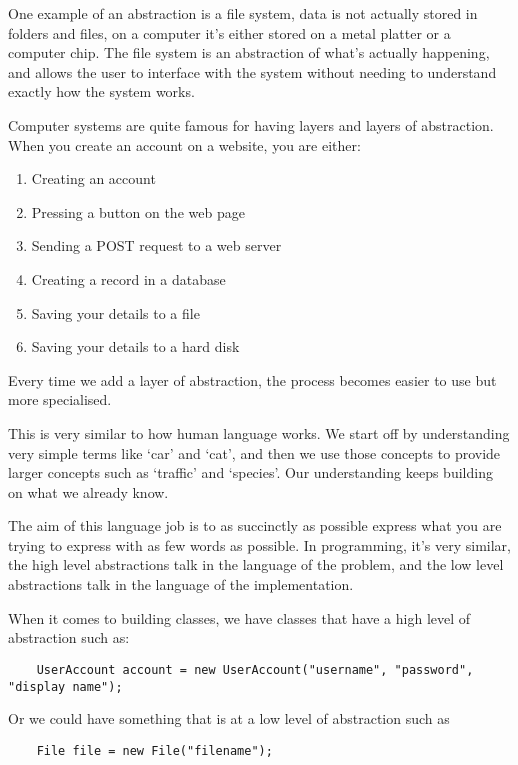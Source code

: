 \documentclass{article}
\begin{document}
  One example of an abstraction is a file system, data is not actually stored in folders and files, on
  a computer it's either stored on a metal platter or a computer chip.
  The file system is an abstraction of what's actually happening, and allows
  the user to interface with the system without needing to understand exactly
  how the system works.

  Computer systems are quite famous for having layers and layers of abstraction.
  When you create an account on a website, you are either:

  \begin{enumerate}
    \item Creating an account
    \item Pressing a button on the web page
    \item Sending a POST request to a web server
    \item Creating a record in a database
    \item Saving your details to a file
    \item Saving your details to a hard disk
  \end{enumerate}

  Every time we add a layer of abstraction, the process becomes easier to use
  but more specialised.

  This is very similar to how human language works. We start off by understanding
  very simple terms like `car' and `cat', and then we use those concepts to provide
  larger concepts such as `traffic' and `species'. Our understanding keeps building
  on what we already know.

  The aim of this language job is to as succinctly as possible express what you
  are trying to express with as few words as possible. In programming, it's very
  similar, the high level abstractions talk in the language of the problem,
  and the low level abstractions talk in the language of the implementation.

  When it comes to building classes, we have classes that have a high level
  of abstraction such as:

  \begin{verbatim}
    UserAccount account = new UserAccount("username", "password", "display name");
  \end{verbatim}

  Or we could have something that is at a low level of abstraction such as
  \begin{verbatim}
    File file = new File("filename");
  \end{verbatim}
\end{document}
